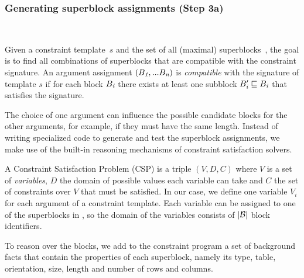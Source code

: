 \subsubsection{Generating superblock assignments (Step 3a)}
\label{sec:algo:super}
\

Given a constraint template~$s$ and the set of all (maximal) superblocks~\blocks, the goal is to find all combinations of superblocks that are compatible with the constraint signature.
An argument assignment $(B_{\textit{1}}, ... B_{\textit{n}})$ is \textit{compatible} with the signature of template $s$ if for each block $B_{\textit{i}}$ there exists at least one subblock $B_{\textit{i}}' \sqsubseteq B_{\textit{i}}$ that satisfies the signature.

The choice of one argument can influence the possible candidate blocks for the other arguments, for example, if they must have the same length.
Instead of writing specialized code to generate and test the superblock assignments, we make use of the built-in reasoning mechanisms of constraint satisfaction solvers.

A Constraint Satisfaction Problem (CSP) is a triple $(V,D,C)$ where $V$ is a set of \textit{variables}, $D$ the domain of possible values each variable can take and $C$ the set of constraints over $V$ that must be satisfied.
In our case, we define one variable $V_i$ for each argument of a constraint template.
Each variable can be assigned to one of the superblocks in \blocks, so the domain of the variables consists of $|\mathcal{B}|$ block identifiers.


To reason over the blocks, we add to the constraint program a set of background facts that contain the properties of each superblock, namely its type, table, orientation, size, length and number of rows and columns.


